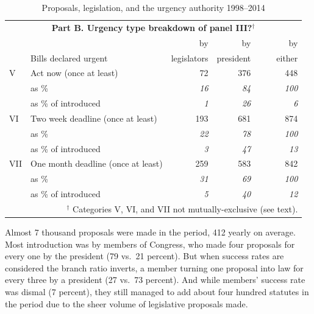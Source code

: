 \documentclass[letter,12pt]{article}
\begin{document}
\begin{table}
\begin{tabular}{llrrr}
\multicolumn{5}{c}{\textbf{Part B. Urgency type breakdown of panel III?$^\dagger$}} \\
    &                                    &  by           &  by          &    by      \\
    & Bills declared urgent              &  legislators  &  president   &    ~~~~either  \\ \hline
V   & Act now (once at least)            &          72   &        376   &        448 \\
    & as \%                              &    \emph{16}  &   \emph{84}  & \emph{100} \\
    & as \% of introduced                &     \emph{1}  &   \emph{26}  &   \emph{6} \\ \hdashline
VI  & Two week deadline (once at least)  &          193  &         681  &       874  \\
    & as \%                              &    \emph{22}  &   \emph{78}  & \emph{100} \\
    & as \% of introduced                &     \emph{3}  &   \emph{47}  &  \emph{13} \\ \hdashline
VII & One month deadline (once at least) &          259  &         583  &       842  \\
    & as \%                              &    \emph{31}  &   \emph{69}  & \emph{100} \\
    & as \% of introduced                &     \emph{5}  &   \emph{40}  &  \emph{12} \\ %
\hline
\multicolumn{5}{r}{\footnotesize{$^\dagger$ Categories V, VI, and VII not mutually-exclusive (see text).}} \\
\end{tabular}
\caption{Proposals, legislation, and the urgency authority 1998--2014}\label{T:billDescriptives}
\end{table}

Almost 7 thousand proposals were made in the period, 412 yearly on average. Most introduction was by members of Congress, who made four proposals for every one by the president (79 vs.\ 21 percent). But when success rates are considered the branch ratio inverts, a member turning one proposal into law for every three by a president (27 vs.\ 73 percent). And while members' success rate was dismal (7 percent), they still managed to add about four hundred statutes in the period due to the sheer volume of legislative proposals made. 
\end{document}
